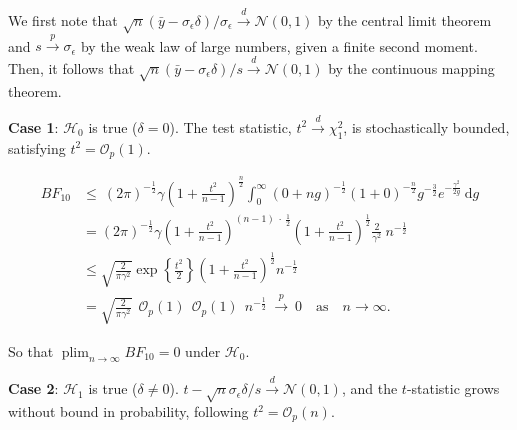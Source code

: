 \documentclass[preprint,12pt,authoryear]{elsarticle}
\DeclareMathOperator*{\plim}{plim}
\begin{document}
We first note that $\sqrt{n}(\bar{y}-\sigma_\epsilon\delta)/\sigma_\epsilon\overset{d}{\to}\mathcal{N}(0,1)$ by the central limit theorem and $s\overset{p}{\to}\sigma_\epsilon$ by the weak law of large numbers, given a finite second moment. Then, it follows that $\sqrt{n}(\bar{y}-\sigma_\epsilon\delta)/s\overset{d}{\to}\mathcal{N}(0,1)$ by the continuous mapping theorem.

\textbf{Case 1}: $\mathcal{H}_0$ is true ($\delta=0$). The test statistic, $t^2\overset{d}{\to}\chi_1^2$, is stochastically bounded, satisfying $t^2=\mathcal{O}_p(1)$.

\begin{align*}
	\mathit{BF}_{10}
	&\leqslant\ (2\pi)^{-\frac{1}{2}}\gamma\left(1+\frac{t^2}{n-1}\right)^{\frac{n}{2}}\int_0^\infty(0+ng)^{-\frac{1}{2}}\left(1+0\right)^{-\frac{n}{2}}\!g^{-\frac{3}{2}}e^{-\frac{\gamma^2}{2g}}\ \!\mathrm{d}g \\
	&=(2\pi)^{-\frac{1}{2}}\gamma\left(1+\frac{t^2}{n-1}\right)^{(n-1)\ \!\cdot\ \!\frac{1}{2}}
	\left(1+\frac{t^2}{n-1}\right)^{\frac{1}{2}}{\frac{2}{\gamma^2}\ \!n^{-\frac{1}{2}}} \\
	&\leqslant\sqrt{\frac{2}{\pi\gamma^2}}\exp\left\{\frac{t^2}{2}\right\}
	\left(1+\frac{t^2}{n-1}\right)^{\frac{1}{2}}n^{-\frac{1}{2}} \\
	&=\sqrt{\frac{2}{\pi\gamma^2}}\ \ \!\mathcal{O}_p(1)\ \ \!\mathcal{O}_p(1)\ \ \!n^{-\frac{1}{2}}\ \!\overset{p}{\to}\ \!0
	\quad\text{as}\quad n\to\infty.
\end{align*}

So that $\displaystyle\plim_{n\to\infty}\mathit{BF}_{10}=0$ under $\mathcal{H}_0$.

\textbf{Case 2}: $\mathcal{H}_1$ is true ($\delta\neq0$). $t-\sqrt{n}\sigma_\epsilon\delta/s\overset{d}{\to}\mathcal{N}(0,1)$, and the $t$-statistic grows without bound in probability, following $t^2=\mathcal{O}_p(n)$.
\end{document}
